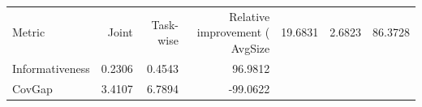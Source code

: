 \begin{tabular}{lrrr}
\toprule
Metric & Joint & Task-wise & Relative improvement (%
\midrule
AvgSize & 19.6831 & 2.6823 & 86.3728 \\
Informativeness & 0.2306 & 0.4543 & 96.9812 \\
CovGap & 3.4107 & 6.7894 & -99.0622 \\
\bottomrule
\end{tabular}
